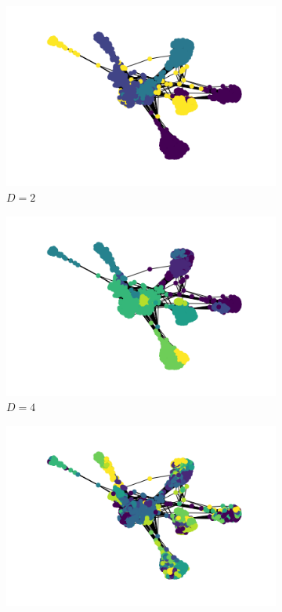 \documentclass[conference]{IEEEtran}
\begin{document}
\begin{figure}[htbp]
    \centering
    \begin{subfigure}{.33\textwidth}
        \centering
        \includegraphics[width=1\linewidth]{images/fb/graph_d2.png}
        \caption{$D=2$}
    \end{subfigure}%
    \begin{subfigure}{.33\textwidth}
        \centering
        \includegraphics[width=1\linewidth]{images/fb/graph_d4.png}
        \caption{$D=4$}
    \end{subfigure}%
    \begin{subfigure}{.33\textwidth}
        \centering
        \includegraphics[width=1\linewidth]{images/fb/graph_d128.png}

\end{subfigure}
\end{figure}
\end{document}
